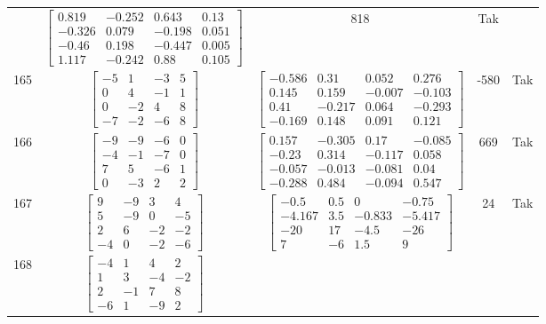 \documentclass[a4paper,12pt]{article}
\begin{document}
\begin{tabular}{c c c c c}
&
$\begin{bmatrix} 0.819 & -0.252 & 0.643 & 0.13 \\ -0.326 & 0.079 & -0.198 & 0.051 \\ -0.46 & 0.198 & -0.447 & 0.005 \\ 1.117 & -0.242 & 0.88 & 0.105 \end{bmatrix}$
&
818
&
Tak
\\
165
&
$\begin{bmatrix} -5 & 1 & -3 & 5 \\ 0 & 4 & -1 & 1 \\ 0 & -2 & 4 & 8 \\ -7 & -2 & -6 & 8 \end{bmatrix}$
&
$\begin{bmatrix} -0.586 & 0.31 & 0.052 & 0.276 \\ 0.145 & 0.159 & -0.007 & -0.103 \\ 0.41 & -0.217 & 0.064 & -0.293 \\ -0.169 & 0.148 & 0.091 & 0.121 \end{bmatrix}$
&
-580
&
Tak
\\
166
&
$\begin{bmatrix} -9 & -9 & -6 & 0 \\ -4 & -1 & -7 & 0 \\ 7 & 5 & -6 & 1 \\ 0 & -3 & 2 & 2 \end{bmatrix}$
&
$\begin{bmatrix} 0.157 & -0.305 & 0.17 & -0.085 \\ -0.23 & 0.314 & -0.117 & 0.058 \\ -0.057 & -0.013 & -0.081 & 0.04 \\ -0.288 & 0.484 & -0.094 & 0.547 \end{bmatrix}$
&
669
&
Tak
\\
167
&
$\begin{bmatrix} 9 & -9 & 3 & 4 \\ 5 & -9 & 0 & -5 \\ 2 & 6 & -2 & -2 \\ -4 & 0 & -2 & -6 \end{bmatrix}$
&
$\begin{bmatrix} -0.5 & 0.5 & 0 & -0.75 \\ -4.167 & 3.5 & -0.833 & -5.417 \\ -20 & 17 & -4.5 & -26 \\ 7 & -6 & 1.5 & 9 \end{bmatrix}$
&
24
&
Tak
\\
168
&
$\begin{bmatrix} -4 & 1 & 4 & 2 \\ 1 & 3 & -4 & -2 \\ 2 & -1 & 7 & 8 \\ -6 & 1 & -9 & 2 \end{bmatrix}$

\end{tabular}
\end{document}
